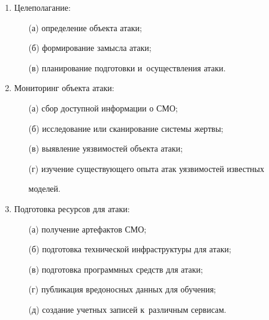     \begin{enumerate}[1.]

\item Целеполагание:

\begin{itemize}

\item[(а)] определение объекта атаки;

\item[(б)] формирование замысла атаки;

\item[(в)] планирование подготовки и~осуществления атаки.

\end{itemize}

\item Мониторинг объекта атаки:

    \begin{itemize}

\item[(а)] сбор доступной информации о СМО;

\item[(б)] исследование или сканирование системы жертвы;

\item[(в)] выявление уязвимостей объекта атаки;

\item[(г)] изучение существующего опыта атак уязвимостей известных 

моделей.

\end{itemize}

\item Подготовка ресурсов для атаки:

\begin{itemize}

\item[(а)] получение артефактов СМО;

\item[(б)] подготовка технической инфраструктуры для атаки;

\item[(в)] подготовка программных средств для атаки;

\item[(г)] публикация вредоносных данных для обучения;

\item[(д)] создание учетных записей к~различным сервисам.

\end{itemize}


\end{enumerate}
